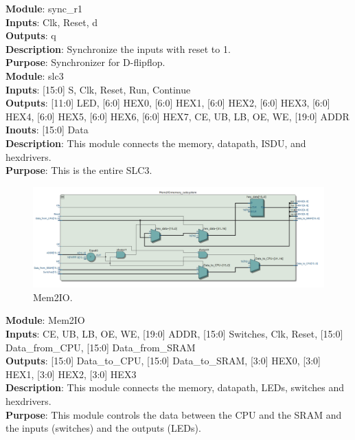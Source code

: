 \documentclass[12pt]{article}
\begin{document}
\textbf{Module}: sync\_r1 \\ 
\textbf{Inputs}: Clk, Reset, d \\ 
\textbf{Outputs}: q \\ 
\textbf{Description}: Synchronize the inputs with reset to 1. \\
\textbf{Purpose}: Synchronizer for D-flipflop. \\

\textbf{Module}: slc3 \\ 
\textbf{Inputs}: [15:0] S, Clk, Reset, Run, Continue \\ 
\textbf{Outputs}: [11:0] LED, [6:0] HEX0, [6:0] HEX1, [6:0] HEX2, [6:0] HEX3, [6:0] HEX4, [6:0] HEX5, [6:0] HEX6, [6:0] HEX7, CE, UB, LB, OE, WE, [19:0] ADDR \\ 
\textbf{Inouts}: [15:0] Data \\
\textbf{Description}: This module connects the memory, datapath, ISDU, and hexdrivers. \\
\textbf{Purpose}: This is the entire SLC3. \\

\begin{figure}[H]
    \centering
    \includegraphics[width=15cm]{mem2IO.png}
    \caption{Mem2IO.}
\end{figure}
\textbf{Module}: Mem2IO \\ 
\textbf{Inputs}: CE, UB, LB, OE, WE, [19:0] ADDR, [15:0] Switches, Clk, Reset, [15:0] Data\_from\_CPU, [15:0]   Data\_from\_SRAM \\ 
\textbf{Outputs}: [15:0] Data\_to\_CPU, [15:0] Data\_to\_SRAM, [3:0] HEX0, [3:0] HEX1, [3:0] HEX2, [3:0] HEX3 \\ 
\textbf{Description}: This module connects the memory, datapath, LEDs,  switches and hexdrivers. \\
\textbf{Purpose}: This module controls the data between the CPU and the SRAM and the inputs (switches) and the outputs (LEDs). \\
\end{document}
